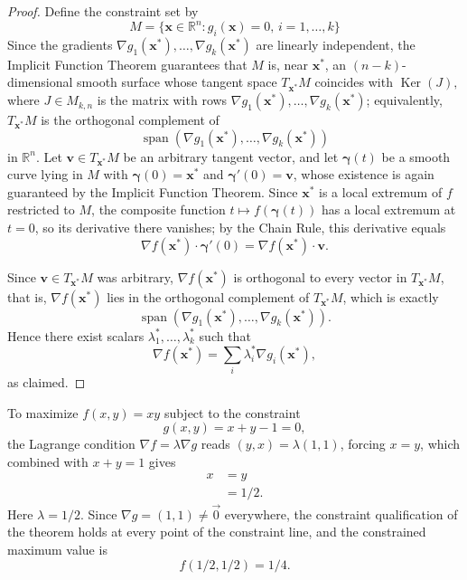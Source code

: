 \begin{proof}
Define the constraint set by
\[
M = \{\mathbf{x} \in \mathbb{R}^n : g_i(\mathbf{x}) = 0, \, i=1,\dots,k\}
\]
Since the gradients $\nabla g_1(\mathbf{x}^*), \dots, \nabla g_k(\mathbf{x}^*)$ are linearly independent, the Implicit Function Theorem guarantees that $M$ is, near $\mathbf{x}^*$, an $(n-k)$-dimensional smooth surface whose tangent space $T_{\mathbf{x}^*}M$ coincides with $\operatorname{Ker}(J),$ where $J \in M_{k,n}$ is the matrix with rows $\nabla g_1(\mathbf{x}^*), \dots, \nabla g_k(\mathbf{x}^*)$; equivalently, $T_{\mathbf{x}^*}M$ is the orthogonal complement of
\[
\operatorname{span}(\nabla g_1(\mathbf{x}^*), \dots, \nabla g_k(\mathbf{x}^*))
\]
 in $\mathbb{R}^n$. Let $\mathbf{v} \in T_{\mathbf{x}^*}M$ be an arbitrary tangent vector, and let $\boldsymbol{\gamma}(t)$ be a smooth curve lying in $M$ with $\boldsymbol{\gamma}(0)=\mathbf{x}^*$ and $\boldsymbol{\gamma}'(0) = \mathbf{v}$, whose existence is again guaranteed by the Implicit Function Theorem. Since $\mathbf{x}^*$ is a local extremum of $f$ restricted to $M$, the composite function $t \mapsto f(\boldsymbol{\gamma}(t))$ has a local extremum at $t=0$, so its derivative there vanishes; by the Chain Rule, this derivative equals
\[
\nabla f(\mathbf{x}^*) \cdot \boldsymbol{\gamma}'(0) = \nabla f(\mathbf{x}^*) \cdot \mathbf{v}.
\]

Since $\mathbf{v} \in T_{\mathbf{x}^*}M$ was arbitrary, $\nabla f(\mathbf{x}^*)$ is orthogonal to every vector in $T_{\mathbf{x}^*}M$, that is, $\nabla f(\mathbf{x}^*)$ lies in the orthogonal complement of $T_{\mathbf{x}^*}M$, which is exactly
\[
\operatorname{span}(\nabla g_1(\mathbf{x}^*), \dots, \nabla g_k(\mathbf{x}^*)).
\]
Hence there exist scalars $\lambda_1^*, \dots, \lambda_k^*$ such that
\[
\nabla f(\mathbf{x}^*) = \sum_i \lambda_i^* \nabla g_i(\mathbf{x}^*),
\]
as claimed.
\end{proof}

\begin{example}
To maximize $f(x,y) = xy$ subject to the constraint
\[
g(x,y) = x+y-1 = 0,
\] the Lagrange condition $\nabla f = \lambda \nabla g$ reads $(y,x) = \lambda(1,1)$, forcing $x=y$, which combined with $x+y=1$ gives
\[
\begin{aligned}
x &= y \\
&= 1/2.
\end{aligned}
\]
Here $\lambda = 1/2$. Since $\nabla g = (1,1) \neq \vec{0}$ everywhere, the constraint qualification of the theorem holds at every point of the constraint line, and the constrained maximum value is
\[
f(1/2,1/2) = 1/4.
\]

\end{example}

